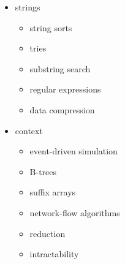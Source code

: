 \documentclass[8pt,a4paper,compress,handout]{beamer}
\begin{document}
\begin{frame}[fragile]
\begin{itemize}
\item strings
\begin{itemize}
\item string sorts
\item tries
\item substring search
\item regular expressions
\item data compression
\end{itemize}

\item context
\begin{itemize}
\item event-driven simulation
\item B-trees
\item suffix arrays
\item network-flow algorithms
\item reduction
\item intractability
\end{itemize}
\end{itemize}
\end{frame}
\end{document}
